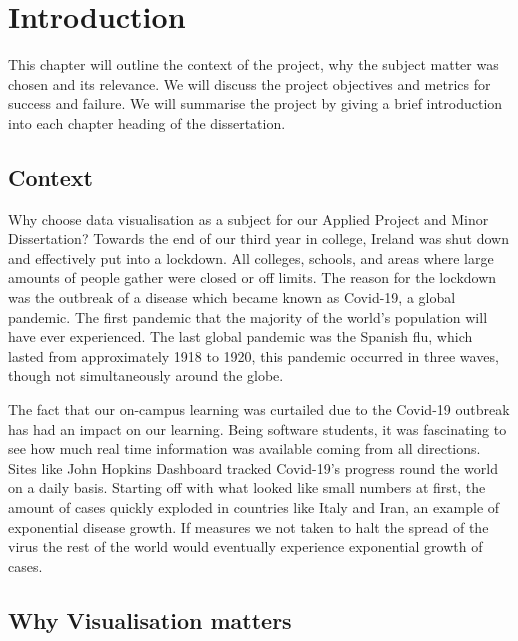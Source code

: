 \chapter{Introduction}


This chapter will outline the context of the project, why the subject matter was chosen and its relevance. We will discuss the project objectives and metrics for success and failure. We will summarise the project by giving a brief introduction into each chapter heading of the dissertation.

\section{Context}
Why choose data visualisation as a subject for our Applied Project and Minor Dissertation? Towards the end of our third year in college, Ireland was shut down and effectively put into a lockdown. All colleges, schools, and areas where large amounts of people gather were closed or off limits. The reason for the lockdown was the outbreak of a disease which became known as Covid-19, a global pandemic. The first pandemic that the majority of the world's population will have ever experienced. The last global pandemic was the Spanish flu, which lasted from approximately 1918 to 1920, this pandemic occurred in three waves, though not simultaneously around the globe.\cite{Spanishflu}\\

\vspace{1mm}

The fact that our on-campus learning was curtailed due to the Covid-19 outbreak has had an impact on our learning. Being software students, it was fascinating to see how much real time information was available coming from all directions. Sites like John Hopkins Dashboard tracked Covid-19's progress round the world on a daily basis. Starting off with what looked like small numbers at first, the amount of cases quickly exploded in countries like Italy and Iran, an example of exponential disease growth. If measures we not taken to halt the spread of the virus the rest of the world would eventually experience exponential growth of cases.\\

\vspace{1mm}
\section{Why Visualisation matters}

